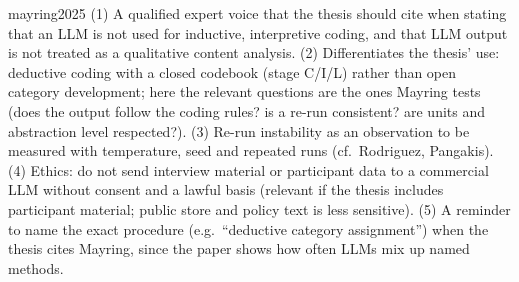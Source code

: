 \begin{papercard}{mayring2025}
 (1) A qualified expert voice that the thesis should cite when stating that an LLM is not used for inductive, interpretive coding, and that LLM output is not treated as a qualitative content analysis. (2) Differentiates the thesis' use: deductive coding with a closed codebook (stage C/I/L) rather than open category development; here the relevant questions are the ones Mayring tests (does the output follow the coding rules? is a re-run consistent? are units and abstraction level respected?). (3) Re-run instability as an observation to be measured with temperature, seed and repeated runs (cf.\ Rodriguez, Pangakis). (4) Ethics: do not send interview material or participant data to a commercial LLM without consent and a lawful basis (relevant if the thesis includes participant material; public store and policy text is less sensitive). (5) A reminder to name the exact procedure (e.g.\ ``deductive category assignment'') when the thesis cites Mayring, since the paper shows how often LLMs mix up named methods.
\end{papercard}
